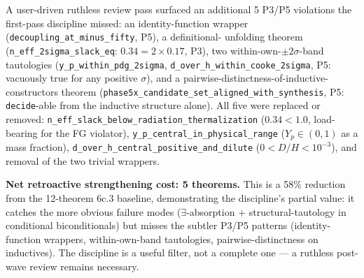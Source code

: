 \documentclass[twocolumn]{revtex4-2}
\begin{document}
A user-driven ruthless review pass surfaced an additional 5 P3/P5
violations the first-pass discipline missed: an identity-function
wrapper (\texttt{decoupling\_at\_minus\_fifty}, P5), a definitional-
unfolding theorem (\texttt{n\_eff\_2sigma\_slack\_eq}: $0.34 =
2 \times 0.17$, P3), two within-own-$\pm 2\sigma$-band tautologies
(\texttt{y\_p\_within\_pdg\_2sigma},
\texttt{d\_over\_h\_within\_cooke\_2sigma}, P5: vacuously true for
any positive $\sigma$), and a pairwise-distinctness-of-inductive-
constructors theorem (\texttt{phase5x\_candidate\_set\_aligned\_with\_synthesis},
P5: \texttt{decide}-able from the inductive structure alone). All
five were replaced or removed:
\texttt{n\_eff\_slack\_below\_radiation\_thermalization} ($0.34 < 1.0$,
load-bearing for the FG violator),
\texttt{y\_p\_central\_in\_physical\_range} ($Y_p \in (0, 1)$ as a
mass fraction),
\texttt{d\_over\_h\_central\_positive\_and\_dilute} ($0 < D/H <
10^{-3}$), and removal of the two trivial wrappers.

\textbf{Net retroactive strengthening cost: 5 theorems.} This is a
58\% reduction from the 12-theorem 6c.3 baseline, demonstrating the
discipline's partial value: it catches the more obvious failure
modes ($\exists$-absorption + structural-tautology in conditional
biconditionals) but misses the subtler P3/P5 patterns
(identity-function wrappers, within-own-band tautologies,
pairwise-distinctness on inductives). The discipline is a useful
filter, not a complete one — a ruthless post-wave review remains
necessary.
\end{document}
